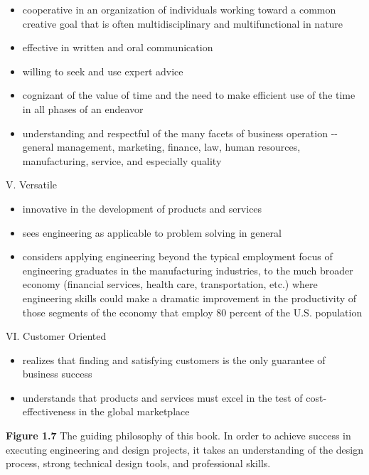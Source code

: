 \documentclass[a4paper,10pt]{book}
\begin{document}
\begin{itemize}
\item
  cooperative in an organization of individuals working toward a common
  creative goal that is often multidisciplinary and multifunctional in
  nature
\item
  effective in written and oral communication
\item
  willing to seek and use expert advice
\item
  cognizant of the value of time and the need to make efficient use of
  the time in all phases of an endeavor
\item
  understanding and respectful of the many facets of business operation
  -\/- general management, marketing, finance, law, human resources,
  manufacturing, service, and especially quality
\end{itemize}

V. Versatile

\begin{itemize}
\item
  innovative in the development of products and services
\item
  sees engineering as applicable to problem solving in general
\item
  considers applying engineering beyond the typical employment focus of
  engineering graduates in the manufacturing industries, to the much
  broader economy (financial services, health care, transportation,
  etc.) where engineering skills could make a dramatic improvement in
  the productivity of those segments of the economy that employ 80
  percent of the U.S. population
\end{itemize}

VI. Customer Oriented

\begin{itemize}
\item
  realizes that finding and satisfying customers is the only guarantee
  of business success
\item
  understands that products and services must excel in the test of
  cost-effectiveness in the global marketplace
\end{itemize}


\textbf{Figure 1.7} The guiding philosophy of this book. In order to
achieve success in executing engineering and design projects, it takes
an understanding of the design process, strong technical design tools,
and professional skills.
\end{document}
